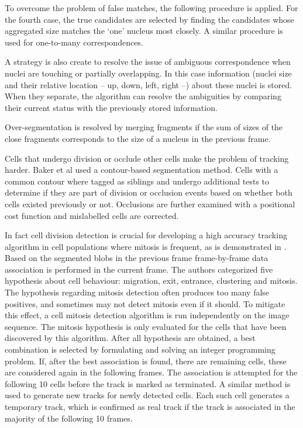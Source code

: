 \documentclass[12pt,a4paper,openany]{book}
\begin{document}
To overcome the problem of false matches, the following procedure is applied. For the fourth case, the true candidates are selected by finding the candidates whose aggregated size matches the `one' nucleus most closely. A similar procedure is used for one-to-many correspondences.

A strategy is also create to resolve the issue of ambiguous correspondence when nuclei are touching or partially overlapping. In this case information (nuclei size and their relative location -- up, down, left, right --) about these nuclei is stored. When they separate, the algorithm can resolve the ambiguities by comparing their current status with the previously stored information.

Over-segmentation is resolved by merging fragments if the sum of sizes of the close fragments corresponds to the size of a nucleus in the previous frame.

Cells that undergo division or occlude other cells make the problem of tracking harder. Baker et al \cite{baker13} used a contour-based segmentation method. Cells with a common contour where tagged as siblings and undergo additional tests to determine if they are part of division or occlusion events based on whether both cells existed previously or not. Occlusions are further examined with a positional cost function and mislabelled cells are corrected.

In fact cell division detection is crucial for developing a high accuracy tracking algorithm in cell populations where mitosis is frequent, as is demonstrated in \cite{huh13}. Based on the segmented blobs in the previous frame frame-by-frame data association is performed in the current frame. The authors categorized five hypothesis about cell behaviour: migration, exit, entrance, clustering and mitosis. The hypothesis regarding mitosis detection often produces too many false positives, and sometimes may not detect mitosis even if it should. To mitigate this effect, a cell mitosis detection algorithm is run independently on the image sequence. The mitosis hypothesis is only evaluated for the cells that have been discovered by this algorithm. After all hypothesis are obtained, a best combination is selected by formulating and solving an integer programming problem. If, after the best association is found, there are remaining cells, these are considered again in the following frames. The association is attempted for the following 10 cells before the track is marked as terminated. A similar method is used to generate new tracks for newly detected cells. Each such cell generates a temporary track, which is confirmed as real track if the track is associated in the majority of the following 10 frames.
\end{document}
